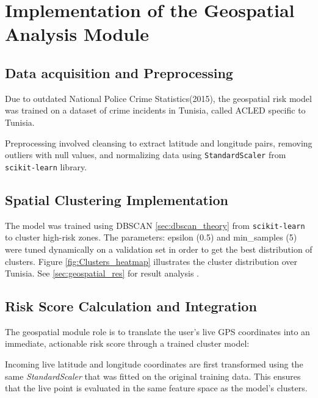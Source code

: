 \documentclass[12pt,a4paper,oneside,english]{book}
\begin{document}
{\section{Implementation of the Geospatial Analysis Module}
\label{geospatial_implementation}
\subsection{Data acquisition and Preprocessing}
Due to outdated National Police Crime Statistics(2015), the geospatial risk model was trained on a dataset of crime incidents in Tunisia, called ACLED \cite{raleigh2010acled} specific to Tunisia.

Preprocessing involved cleansing to extract latitude and longitude pairs, removing outliers with null values, and normalizing data using \texttt{StandardScaler} from \texttt{scikit-learn} library.
\subsection{Spatial Clustering Implementation}
The model was trained using DBSCAN \ref{sec:dbscan_theory} from \texttt{scikit-learn} to cluster high-risk zones. 
The parameters: epsilon (0.5) and min\_samples (5) were tuned dynamically on a validation set in order to get the best distribution of clusters.
Figure \ref{fig:Clusters_heatmap} illustrates the cluster distribution over Tunisia. See \ref{sec:geospatial_res} for result analysis .


\subsection{Risk Score Calculation and Integration}
The geospatial module role is to translate the user's live GPS coordinates into an immediate, actionable risk score  through a trained cluster model:

Incoming live latitude and longitude coordinates are first transformed using the same \textit{StandardScaler} that was fitted on the original training data. This ensures that the live point is evaluated in the same feature space as the model's clusters.

}
\end{document}
